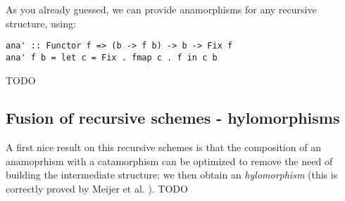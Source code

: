As you already guessed, we can provide anamorphisms for any recursive structure, using:
\begin{verbatim}
ana' :: Functor f => (b -> f b) -> b -> Fix f
ana' f b = let c = Fix . fmap c . f in c b
\end{verbatim}
TODO

\subsection{Fusion of recursive schemes - hylomorphisms}
A first nice result on this recursive schemes is that the composition of an anamoprhism with a catamorphism can be optimized to remove the need of building the intermediate structure: we then obtain an \emph{hylomorphism} (this is correctly proved by Meijer et al. \cite{4cec4a43c86444479dc0003182424795}).
TODO
